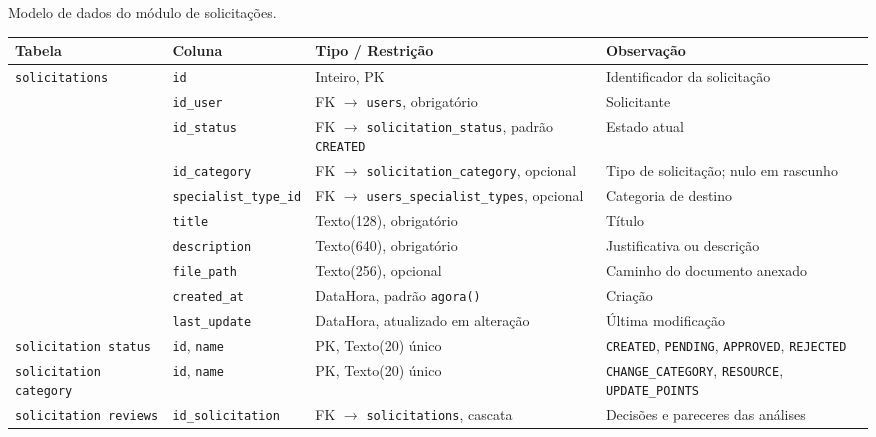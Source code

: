 \begin{quadro}[htbp]
\centering
\caption[Modelo de dados do módulo de solicitações]{Modelo de dados do módulo de solicitações.}
\label{qua:modelo-solicitacao}
\scriptsize
\setlength{\tabcolsep}{2pt}
\begin{tabularx}{\linewidth}{
    @{}
    >{\raggedright\arraybackslash}p{2.2cm}
    >{\raggedright\arraybackslash}p{3.0cm}
    >{\raggedright\arraybackslash}p{3.8cm}
    >{\raggedright\arraybackslash}X
    @{}
}
\toprule
\textbf{Tabela} & \textbf{Coluna} & \textbf{Tipo / Restrição} & \textbf{Observação} \\
\midrule
\texttt{solicitations} & \texttt{id} & Inteiro, PK & Identificador da solicitação \\
 & \texttt{id\_user} & FK $\rightarrow$ \texttt{users}, obrigatório & Solicitante \\
 & \texttt{id\_status} & FK $\rightarrow$ \texttt{solicitation\_status}, padrão \texttt{CREATED} & Estado atual \\
 & \texttt{id\_category} & FK $\rightarrow$ \texttt{solicitation\_category}, opcional & Tipo de solicitação; nulo em rascunho \\
 & \texttt{specialist\_type\_id} & FK $\rightarrow$ \texttt{users\_specialist\_types}, opcional & Categoria de destino \\
 & \texttt{title} & Texto(128), obrigatório & Título \\
 & \texttt{description} & Texto(640), obrigatório & Justificativa ou descrição \\
 & \texttt{file\_path} & Texto(256), opcional & Caminho do documento anexado \\
 & \texttt{created\_at} & DataHora, padrão \texttt{agora()} & Criação \\
 & \texttt{last\_update} & DataHora, atualizado em alteração & Última modificação \\
\midrule
\texttt{solicitation status} & \texttt{id}, \texttt{name} & PK, Texto(20) único & \texttt{CREATED}, \texttt{PENDING}, \texttt{APPROVED}, \texttt{REJECTED} \\
\texttt{solicitation category} & \texttt{id}, \texttt{name} & PK, Texto(20) único & \texttt{CHANGE\_CATEGORY}, \texttt{RESOURCE}, \texttt{UPDATE\_POINTS} \\
\texttt{solicitation reviews} & \texttt{id\_solicitation} & FK $\rightarrow$ \texttt{solicitations}, cascata & Decisões e pareceres das análises \\
\bottomrule
\end{tabularx}
\end{quadro}

